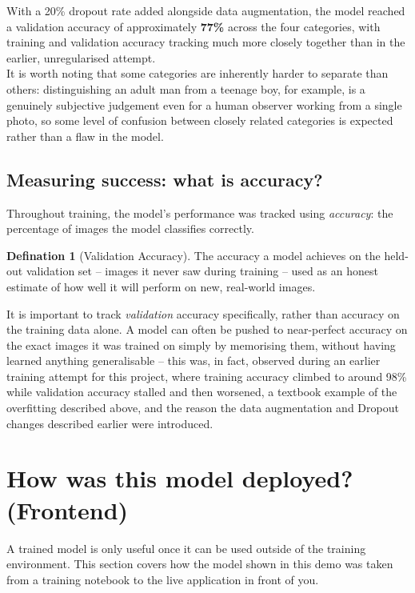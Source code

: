 \documentclass[11 pt , a 4 paper ]{article}
\theoremstyle{definition}
\newtheorem{thm}{Defination}
\begin{document}
\noindent With a 20\% dropout rate added alongside data augmentation, the model reached a validation accuracy of approximately \textbf{77\%} across the four categories, with training and validation accuracy tracking much more closely together than in the earlier, unregularised attempt.\\
 
\noindent It is worth noting that some categories are inherently harder to separate than others: distinguishing an adult man from a teenage boy, for example, is a genuinely subjective judgement even for a human observer working from a single photo, so some level of confusion between closely related categories is expected rather than a flaw in the model.
 
\subsection{Measuring success: what is accuracy?}
 
Throughout training, the model's performance was tracked using \emph{accuracy}: the percentage of images the model classifies correctly.
 
\begin{thm}[Validation Accuracy]
The accuracy a model achieves on the held-out validation set -- images it never saw during training -- used as an honest estimate of how well it will perform on new, real-world images.
\end{thm}
 
\noindent It is important to track \emph{validation} accuracy specifically, rather than accuracy on the training data alone. A model can often be pushed to near-perfect accuracy on the exact images it was trained on simply by memorising them, without having learned anything generalisable -- this was, in fact, observed during an earlier training attempt for this project, where training accuracy climbed to around 98\% while validation accuracy stalled and then worsened, a textbook example of the overfitting described above, and the reason the data augmentation and Dropout changes described earlier were introduced. 

\section{How was this model deployed? (Frontend)}
 
A trained model is only useful once it can be used outside of the training environment. This section covers how the model shown in this demo was taken from a training notebook to the live application in front of you.
 
\end{document}
